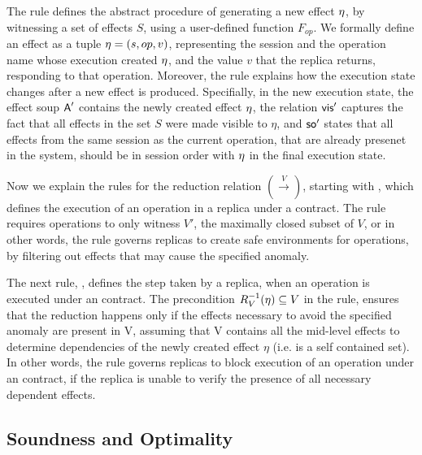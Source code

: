 The rule
 defines the abstract procedure of generating a new effect $\eta$, by witnessing a set
of effects $S$, using a user-defined function $F_{op}$. 
We formally define an effect as a tuple $\eta=(s,op,v)$, representing the
session and the operation name 
whose execution created $\eta$, and the value $v$
that the replica returns, responding to that operation.
%
Moreover, the rule explains how the execution state changes after a new
effect is produced. Specifially, in the new execution state, 
the effect soup
${\normalfont \textsf{A}}'$ contains the newly created effect $\eta$,
the relation ${\normalfont \textsf{vis}}'$
captures the fact that all effects in the set $S$ were made
visible to $\eta$, and ${\textsf{so}}'$ states that all effects from the same
session as the current operation, that are
already presenet in the system, should be in session
order with $\eta$ in the final execution state.

Now we explain the rules for the reduction relation $(\xrightarrow{V})$,
starting with , 
which defines the execution of an
operation in a replica under a \UB{} contract. 
The rule requires operations to only witness $V'$, the maximally closed
subset of $V$, or in other words, the rule governs replicas to 
create safe environments for operations, by
filtering out effects that may cause the specified anomaly. 

The next rule, , defines the step taken by a
replica, when an
operation is executed under an \LB{} contract. The precondition 
$R_V^{-1}(\eta)\subseteq V$ in the rule, ensures that the reduction
happens only if the effects necessary to avoid the specified anomaly are
present in V, assuming that V contains all the mid-level effects to
determine dependencies of the newly created effect $\eta$ (i.e.
is a self contained set). In other words, the rule governs replicas to
block execution of an operation under an \LB{} contract, if the replica is unable to verify the
presence of all necessary dependent effects.


\subsection{Soundness and Optimality}
\label{subsec:sound}


